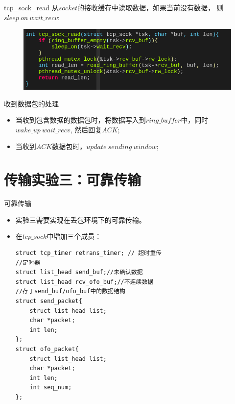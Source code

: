 \documentclass{beamer}
\begin{document}
\begin{frame}{tcp\_sock\_read}
  从$socket$的接收缓存中读取数据，如果当前没有数据， 则$sleep\ on \ wait\_recv$:
  \begin{figure}[H]
	\centering
	\includegraphics[scale = 0.35]{./fig/read.png}
  \end{figure}
\end{frame}

\begin{frame}{收到数据包的处理}
  \begin{itemize}
	\item 当收到包含数据的数据包时，将数据写入到$ring\_buffer$中，同时$wake\_up \ wait\_recv$, 然后回复$ACK$;
	  \item 当收到$ACK$数据包时，$update\ sending\ window$;
  \end{itemize}
\end{frame}

\section{传输实验三：可靠传输}

\begin{frame}[fragile]{可靠传输}
  \begin{itemize}
	\item 
  实验三需要实现在丢包环境下的可靠传输。
  \item 在$tcp\_sock$中增加三个成员：
\begin{lstlisting}
struct tcp_timer retrans_timer; // 超时重传
//定时器
struct list_head send_buf;//未确认数据
struct list_head rcv_ofo_buf;//不连续数据
//存于send_buf/ofo_buf中的数据结构
struct send_packet{
    struct list_head list;
    char *packet;
    int len;
};
struct ofo_packet{
    struct list_head list;
    char *packet;
    int len;
    int seq_num;
};
\end{lstlisting}
  \end{itemize}
\end{frame}
\end{document}
